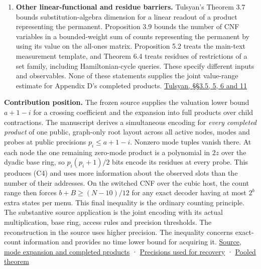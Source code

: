 \documentclass[
  11pt,
]{article}
\begin{document}
\begin{enumerate}
  Definition 5.1 assumes rational Hermite recovery for every polynomial
  through a specified degree. Section 5.1 explicitly explains why
  tapered modular recovery in Appendix D falls outside that model.
  Theorems 8.1 and 8.3 charge specified clause-product evaluation costs.
  Their Proposition 4.1 and Appendix B.1 \emph{do} examine Appendix D's
  prescribed higher root precision and estimate the certified
  running-time bound from mode tuple enumeration. Counting tuple indices
  at that precision does not control how many different menus of reduced
  slot \emph{values} varying inputs can produce.
  \href{https://arxiv.org/html/2611.00517v1}{Dias and Lima, §§4--5, 8
  and Appendix B.1}
\item
  \textbf{Other linear-functional and residue barriers.} Tulsyan's
  Theorem 3.7 bounds substitution-algebra dimension for a linear readout
  of a product representing the permanent. Proposition 3.9 bounds the
  number of CNF variables in a bounded-weight sum of counts representing
  the permanent by using its value on the all-ones matrix. Proposition
  5.2 treats the main-text measurement template, and Theorem 6.4 treats
  residues of restrictions of a set family, including Hamiltonian-cycle
  queries. These specify different inputs and observables. None of these
  statements supplies the joint value-range estimate for Appendix D's
  completed products.
  \href{https://hexagonmath.org/pdf/2611.00149v1}{Tulsyan, §§3.5, 5, 6
  and 11}
\end{enumerate}

\textbf{Contribution position.} The frozen source supplies the valuation
lower bound \(a+1-i\) for a crossing coefficient and the expansion into
full products over child contractions. The manuscript derives a
simultaneous encoding for \emph{every completed product} of one public,
graph-only root layout across all active nodes, modes and probes at
public precisions \(p_i\le a+1-i\). Nonzero mode tuples vanish there. At
each node the one remaining zero-mode product is a polynomial in \(2z\)
over the dyadic base ring, so \(p_i(p_i+1)/2\) bits encode its residues
at every probe. This produces (C4) and uses more information about the
observed slots than the number of their addresses. On the switched CNF
over the cubic host, the count range then forces \(b+B\ge(N-10)/12\) for
any exact decoder having at most \(2^b\) extra states per menu. This
final inequality is the ordinary counting principle. The substantive
source application is the joint encoding with its actual multiplication,
base ring, access rules and precision thresholds. The reconstruction in
the source uses higher precision. The inequality concerns exact-count
information and provides no time lower bound for acquiring it.
\href{https://github.com/openai/math/blob/main/preprints/The-Exponential-Time-Hypothesis-is-False-October-25-2026/build/quantitative-contraction.tex\#L385-L523}{Source,
mode expansion and completed products} ·
\href{https://github.com/openai/math/blob/main/preprints/The-Exponential-Time-Hypothesis-is-False-October-25-2026/build/quantitative-contraction.tex\#L338}{Precisions
used for recovery} · \hyperref[v8-section-pooled-menu-barrier]{Pooled
theorem}
\end{document}
